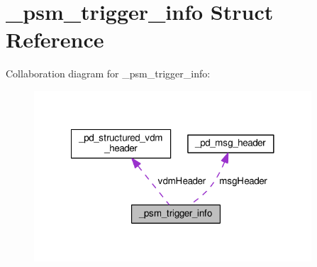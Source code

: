 \hypertarget{struct__psm__trigger__info}{\section{\-\_\-psm\-\_\-trigger\-\_\-info Struct Reference}
\label{struct__psm__trigger__info}
}


Collaboration diagram for \-\_\-psm\-\_\-trigger\-\_\-info\-:
\nopagebreak
\begin{figure}[H]
\begin{center}
\leavevmode
\includegraphics[width=293pt]{struct__psm__trigger__info__coll__graph}
\end{center}
\end{figure}
